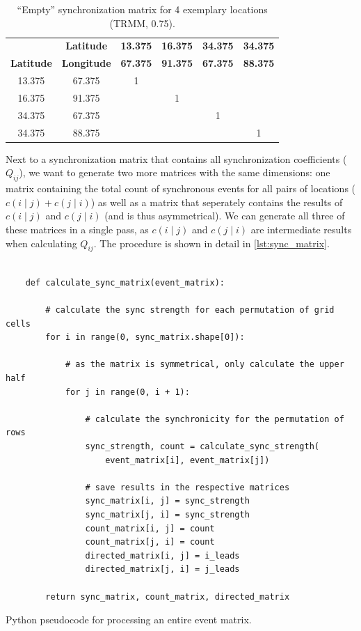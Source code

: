 \begin{table}[h]
  \centering
  \begin{tabular}{ cccccc }
    \toprule
     & \textbf{Latitude} & \textbf{13.375} & \textbf{16.375} & \textbf{34.375} & \textbf{34.375} \\
     \textbf{Latitude} & \textbf{Longitude} & \textbf{67.375} & \textbf{91.375} & \textbf{67.375} & \textbf{88.375} \\
    \midrule
    13.375 & 67.375 & 1 &   &   &   \\
    16.375 & 91.375 &   & 1 &   &   \\
    34.375 & 67.375 &   &   & 1 &   \\
    34.375 & 88.375 &   &   &   & 1 \\
    \bottomrule
  \end{tabular}
  \caption{``Empty'' synchronization matrix for 4 exemplary locations (TRMM, 0.75\degree).}
  \label{tab:example_empty_sync}
\end{table}

Next to a synchronization matrix that contains all synchronization coefficients ($Q_{ij}$), we want to generate two more matrices with the same dimensions: one matrix containing the total count of synchronous events for all pairs of locations ($c(i \mid j) + c(j \mid i)$) as well as a matrix that seperately contains the results of $c(i \mid j)$ and $c(j \mid i)$ (and is thus asymmetrical). We can generate all three of these matrices in a single pass, as $c(i \mid j)$ and $c(j \mid i)$ are intermediate results when calculating $Q_{ij}$. The procedure is shown in detail in \cref{lst:sync_matrix}.

\begin{listing}[h]
  \begin{verbatim}

    def calculate_sync_matrix(event_matrix):

        # calculate the sync strength for each permutation of grid cells
        for i in range(0, sync_matrix.shape[0]):

            # as the matrix is symmetrical, only calculate the upper half
            for j in range(0, i + 1):

                # calculate the synchronicity for the permutation of rows
                sync_strength, count = calculate_sync_strength(
                    event_matrix[i], event_matrix[j])

                # save results in the respective matrices
                sync_matrix[i, j] = sync_strength
                sync_matrix[j, i] = sync_strength
                count_matrix[i, j] = count
                count_matrix[j, i] = count
                directed_matrix[i, j] = i_leads
                directed_matrix[j, i] = j_leads

        return sync_matrix, count_matrix, directed_matrix

  \end{verbatim}
  \caption{Python pseudocode for processing an entire event matrix.}
  \label{lst:sync_matrix}
\end{listing}

